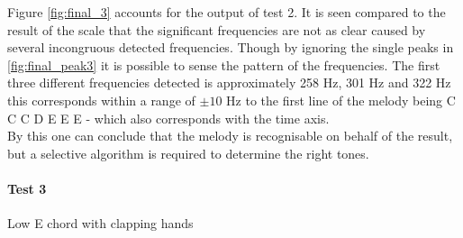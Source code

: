 Figure \ref{fig:final_3} accounts for the output of test 2. It is seen compared to the result of the scale that the significant frequencies are not as clear caused by several incongruous detected frequencies. Though by ignoring the single peaks in  \ref{fig:final_peak3} it is possible to sense the pattern of the frequencies. The first three different frequencies detected is approximately 258 Hz, 301 Hz and 322 Hz 
this corresponds within a range of $\pm 10$ Hz to the first line of the melody being C C C D E E E - which also corresponds with the time axis. \\
By this one can conclude that the melody is recognisable on behalf of the result, but a selective algorithm is required to determine the right tones.                  

\paragraph{Test 3} Low E chord with clapping hands
